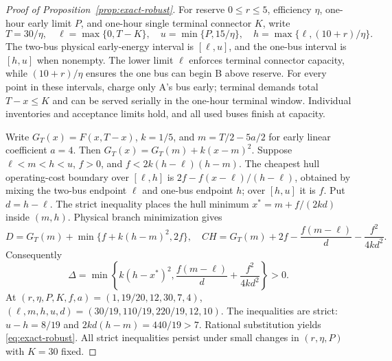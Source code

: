 \begin{proof}[Proof of Proposition~\ref{prop:exact-robust}]
For reserve $0\leq r\leq5$, efficiency $\eta$, one-hour early limit
$P$, and one-hour single terminal connector $K$, write
\[
 T=30/\eta,\quad \ell=\max\{0,T-K\},\quad
 u=\min\{P,15/\eta\},\quad
 h=\max\{\ell,(10+r)/\eta\}.
\]
The two-bus physical early-energy interval is $[\ell,u]$, and the
one-bus interval is $[h,u]$ when nonempty.  The lower limit $\ell$
enforces terminal connector capacity, while $(10+r)/\eta$ ensures the
one bus can begin B above reserve.  For every point in these intervals,
charge only A's bus early; terminal demands total $T-x\leq K$ and can be
served serially in the one-hour terminal window.  Individual inventories
and acceptance limits hold, and all used buses finish at capacity.

Write $G_T(x)=F(x,T-x)$, $k=1/5$, and
$m=T/2-5a/2$ for early linear coefficient $a=4$.  Then
$G_T(x)=G_T(m)+k(x-m)^2$.  Suppose
$\ell<m<h<u$, $f>0$, and
$f<2k(h-\ell)(h-m)$.  The cheapest hull operating-cost boundary over
$[\ell,h]$ is $2f-f(x-\ell)/(h-\ell)$, obtained by mixing the
two-bus endpoint $\ell$ and one-bus endpoint $h$; over $[h,u]$ it is
$f$.  Put $d=h-\ell$.  The strict inequality places the hull minimum
$x^*=m+f/(2kd)$ inside $(m,h)$.  Physical branch minimization gives
\[
 D=G_T(m)+\min\{f+k(h-m)^2,2f\},\quad
 CH=G_T(m)+2f-\frac{f(m-\ell)}d-\frac{f^2}{4kd^2}.
\]
Consequently
\[
 \Delta=\min\left\{k(h-x^*)^2,
       \frac{f(m-\ell)}d+\frac{f^2}{4kd^2}\right\}>0.
\]
At $(r,\eta,P,K,f,a)=(1,19/20,12,30,7,4)$,
$(\ell,m,h,u,d)=(30/19,110/19,220/19,12,10)$.
The inequalities are strict: $u-h=8/19$ and
$2kd(h-m)=440/19>7$.  Rational substitution yields
\eqref{eq:exact-robust}.  All strict inequalities persist under small
changes in $(r,\eta,P)$ with $K=30$ fixed.
\end{proof}


